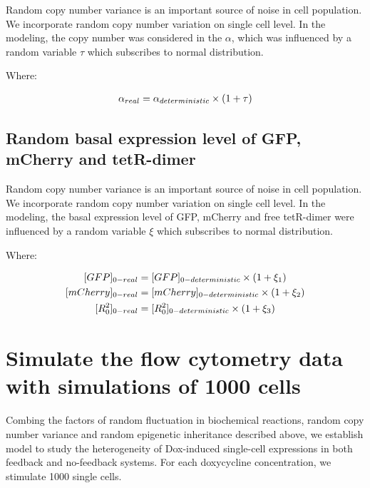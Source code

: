 Random copy number variance is an important source of noise in cell population. We incorporate random copy number variation on single cell level. In the modeling, the copy number was considered in the $\alpha$, which was influenced by a random variable $\tau$ which subscribes to normal distribution.

Where:

\begin{equation} 
\begin{aligned} 
\centering
\alpha_{real}   &= \alpha_{deterministic} \times (1+\tau) \\
\end{aligned} 
\end{equation}

\subsection{Random basal expression level of GFP, mCherry and tetR-dimer}

Random copy number variance is an important source of noise in cell population. We incorporate random copy number variation on single cell level. In the modeling, the basal expression level of GFP, mCherry and free tetR-dimer were influenced by a random variable $\xi$ which subscribes to normal distribution.

Where:

\begin{equation} 
\begin{aligned} 
\centering
[GFP]_{0-real}   &= [GFP]_{0-deterministic} \times (1+\xi_1) \\
[mCherry]_{0-real}   &= [mCherry]_{0-deterministic} \times (1+\xi_2) \\
[R^2_0]_{0-real}   &= [R^2_0]_{0-deterministic} \times (1+\xi_3) \\
\end{aligned} 
\end{equation}

\section{Simulate the flow cytometry data with simulations of 1000 cells}

Combing the factors of random ﬂuctuation in biochemical reactions, random copy number variance and random epigenetic inheritance described above, we establish model to study the heterogeneity of Dox-induced single-cell expressions in both feedback and no-feedback systems. For each doxycycline concentration, we stimulate 1000 single cells.

